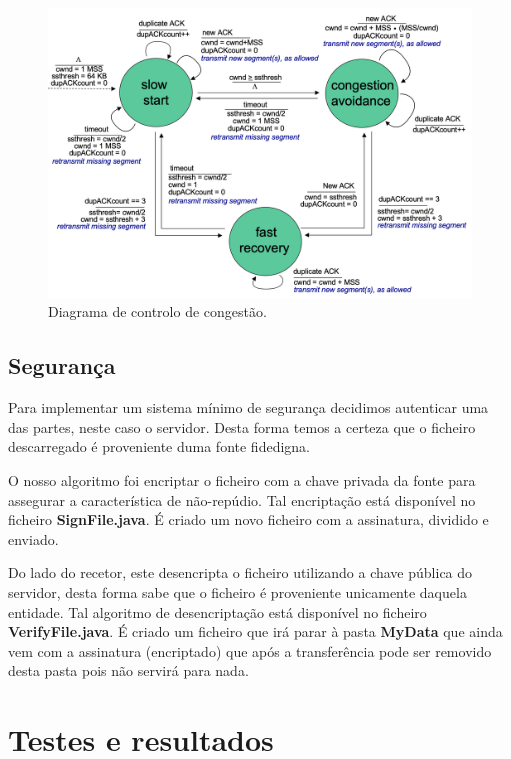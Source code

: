 \documentclass{llncs}
\begin{document}
\begin{figure}[H]
\begin{center}
\includegraphics[scale=0.4]{Controlo_Congestao.png}
\end{center}
\caption{Diagrama de controlo de congestão.}
\end{figure}

\subsection{Segurança}

Para implementar um sistema mínimo de segurança decidimos autenticar uma das partes, neste caso o servidor. Desta forma temos a certeza que o ficheiro descarregado é proveniente duma fonte fidedigna.

O nosso algoritmo foi encriptar o ficheiro com a chave privada da fonte para assegurar a característica de não-repúdio. Tal encriptação está disponível no ficheiro \textbf{SignFile.java}. É criado um novo ficheiro com a assinatura, dividido e enviado.

Do lado do recetor, este desencripta o ficheiro utilizando a chave pública do servidor, desta forma sabe que o ficheiro é proveniente unicamente daquela entidade. Tal algoritmo de desencriptação está disponível no ficheiro \textbf{VerifyFile.java}.
É criado um ficheiro que irá parar à pasta \textbf{MyData} que ainda vem com a assinatura (encriptado) que após a transferência pode ser removido desta pasta pois não servirá para nada.


\section{Testes e resultados}
\end{document}
